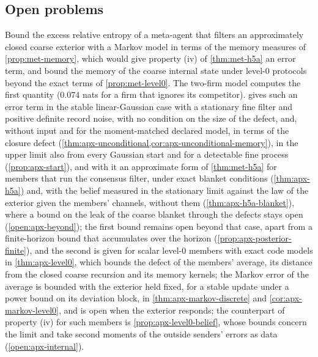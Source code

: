 \subsection{Open problems}\label{sec:met-open}

\begin{openproblem}[An approximate H5a]\label{open:met-approximate}
Bound the excess relative entropy of a meta-agent that filters an approximately closed coarse exterior with a Markov model in terms of the memory measures of \cref{prop:met-memory}, which would give property (iv) of \cref{thm:met-h5a} an error term, and bound the memory of the coarse internal state under level-0 protocols beyond the exact terms of \cref{prop:met-level0}. The two-firm model computes the first quantity ($0.074$ nats for a firm that ignores its competitor).  gives such an error term in the stable linear-Gaussian case with a stationary fine filter and positive definite record noise, with no condition on the size of the defect, and, without input and for the moment-matched declared model, in terms of the closure defect (\cref{thm:apx-unconditional,cor:apx-unconditional-memory}), in the upper limit also from every Gaussian start and for a detectable fine process (\cref{prop:apx-start}), and with it an approximate form of \cref{thm:met-h5a} for members that run the consensus filter, under exact blanket conditions (\cref{thm:apx-h5a}) and, with the belief measured in the stationary limit against the law of the exterior given the members' channels, without them (\cref{thm:apx-h5a-blanket}), where a bound on the leak of the coarse blanket through the defects stays open (\cref{open:apx-beyond}); the first bound remains open beyond that case, apart from a finite-horizon bound that accumulates over the horizon (\cref{prop:apx-posterior-finite}), and the second is given for scalar level-0 members with exact code models in \cref{thm:apx-level0}, which bounds the defect of the members' average, its distance from the closed coarse recursion and its memory kernels; the Markov error of the average is bounded with the exterior held fixed, for a stable update under a power bound on its deviation block, in \cref{thm:apx-markov-discrete} and \cref{cor:apx-markov-level0}, and is open when the exterior responds; the counterpart of property (iv) for such members is \cref{prop:apx-level0-belief}, whose bounds concern the limit and take second moments of the outside senders' errors as data (\cref{open:apx-internal}).
\end{openproblem}


